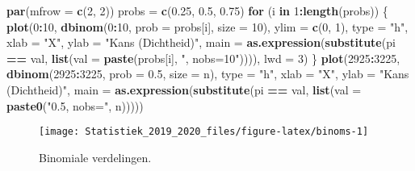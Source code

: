 \documentclass[12pt,dutch,coursenotes]{book}
\newenvironment{Shaded}{\begin{snugshade}}{\end{snugshade}}
\newcommand{\KeywordTok}[1]{\textcolor[rgb]{0.13,0.29,0.53}{\textbf{#1}}}
\newcommand{\DataTypeTok}[1]{\textcolor[rgb]{0.13,0.29,0.53}{#1}}
\newcommand{\DecValTok}[1]{\textcolor[rgb]{0.00,0.00,0.81}{#1}}
\newcommand{\FloatTok}[1]{\textcolor[rgb]{0.00,0.00,0.81}{#1}}
\newcommand{\StringTok}[1]{\textcolor[rgb]{0.31,0.60,0.02}{#1}}
\newcommand{\ControlFlowTok}[1]{\textcolor[rgb]{0.13,0.29,0.53}{\textbf{#1}}}
\newcommand{\OperatorTok}[1]{\textcolor[rgb]{0.81,0.36,0.00}{\textbf{#1}}}
\newcommand{\NormalTok}[1]{#1}
\theoremstyle{definition}
\theoremstyle{definition}
\theoremstyle{definition}
\theoremstyle{remark}
\begin{document}
\begin{Shaded}
\begin{Highlighting}[]
\KeywordTok{par}\NormalTok{(}\DataTypeTok{mfrow =} \KeywordTok{c}\NormalTok{(}\DecValTok{2}\NormalTok{, }\DecValTok{2}\NormalTok{))}
\NormalTok{probs =}\StringTok{ }\KeywordTok{c}\NormalTok{(}\FloatTok{0.25}\NormalTok{, }\FloatTok{0.5}\NormalTok{, }\FloatTok{0.75}\NormalTok{)}
\ControlFlowTok{for}\NormalTok{ (i }\ControlFlowTok{in} \DecValTok{1}\OperatorTok{:}\KeywordTok{length}\NormalTok{(probs)) \{}
    \KeywordTok{plot}\NormalTok{(}\DecValTok{0}\OperatorTok{:}\DecValTok{10}\NormalTok{, }\KeywordTok{dbinom}\NormalTok{(}\DecValTok{0}\OperatorTok{:}\DecValTok{10}\NormalTok{, }\DataTypeTok{prob =}\NormalTok{ probs[i], }\DataTypeTok{size =} \DecValTok{10}\NormalTok{), }
        \DataTypeTok{ylim =} \KeywordTok{c}\NormalTok{(}\DecValTok{0}\NormalTok{, }\DecValTok{1}\NormalTok{), }\DataTypeTok{type =} \StringTok{"h"}\NormalTok{, }\DataTypeTok{xlab =} \StringTok{"X"}\NormalTok{, }\DataTypeTok{ylab =} \StringTok{"Kans (Dichtheid)"}\NormalTok{, }
        \DataTypeTok{main =} \KeywordTok{as.expression}\NormalTok{(}\KeywordTok{substitute}\NormalTok{(pi }\OperatorTok{==}\StringTok{ }\NormalTok{val, }
            \KeywordTok{list}\NormalTok{(}\DataTypeTok{val =} \KeywordTok{paste}\NormalTok{(probs[i], }\StringTok{", nobs=10"}\NormalTok{)))), }
        \DataTypeTok{lwd =} \DecValTok{3}\NormalTok{)}
\NormalTok{\}}
\KeywordTok{plot}\NormalTok{(}\DecValTok{2925}\OperatorTok{:}\DecValTok{3225}\NormalTok{, }\KeywordTok{dbinom}\NormalTok{(}\DecValTok{2925}\OperatorTok{:}\DecValTok{3225}\NormalTok{, }\DataTypeTok{prob =} \FloatTok{0.5}\NormalTok{, }\DataTypeTok{size =}\NormalTok{ n), }
    \DataTypeTok{type =} \StringTok{"h"}\NormalTok{, }\DataTypeTok{xlab =} \StringTok{"X"}\NormalTok{, }\DataTypeTok{ylab =} \StringTok{"Kans (Dichtheid)"}\NormalTok{, }
    \DataTypeTok{main =} \KeywordTok{as.expression}\NormalTok{(}\KeywordTok{substitute}\NormalTok{(pi }\OperatorTok{==}\StringTok{ }\NormalTok{val, }\KeywordTok{list}\NormalTok{(}\DataTypeTok{val =} \KeywordTok{paste0}\NormalTok{(}\StringTok{"0.5, nobs="}\NormalTok{, }
\NormalTok{        n)))))}
\end{Highlighting}
\end{Shaded}

\begin{figure}

{\centering \texttt{[image: Statistiek\_2019\_2020\_files/figure-latex/binoms-1]} 

}

\caption{Binomiale verdelingen.}\label{fig:binoms}
\end{figure}
\end{document}
